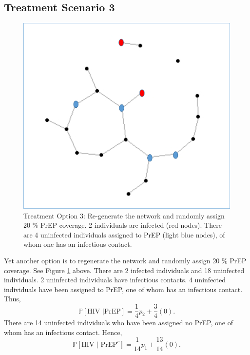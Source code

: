\documentclass{article}
\theoremstyle{definition}
\begin{document}
\subsection{Treatment Scenario 3}
\begin{figure}[H]
    \centering
    \includegraphics[scale=0.5]{Network Example 5.png}
    \caption{Treatment Option 3: Re-generate the network and randomly assign 20 \% PrEP coverage. 2 individuals are infected (red nodes). There are 4 uninfected individuals assigned to PrEP (light blue nodes), of whom one has an infectious contact. }
    \label{fig:Figure 6}
\end{figure}

Yet another option is to regenerate the network and randomly assign 20 \% PrEP coverage. See Figure \ref{fig:Figure 6} above. There are 2 infected individuals and 18 uninfected individuals. 2 uninfected individuals have infectious contacts. 4 uninfected individuals have been assigned to PrEP, one of whom has an infectious contact. Thus, $$\mathbb{P}\left[\text{HIV } \vert \text{PrEP}\right]=\frac{1}{4}p_{2}+\frac{3}{4}\left(0\right).$$
There are 14 uninfected individuals who have been assigned no PrEP, one of whom has an infectious contact. Hence, $$\mathbb{P}\left[\text{HIV } \vert \text{ PrEP}^{c}\right]=\frac{1}{14}p_{1}+\frac{13}{14}\left(0\right).$$
\end{document}
